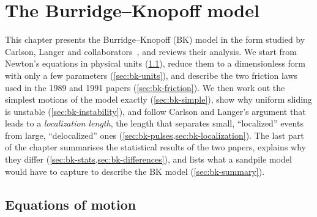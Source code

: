 \chapter{The Burridge--Knopoff model}
\label{ch:bk}

This chapter presents the Burridge--Knopoff (BK) model in the form studied by Carlson,
Langer and collaborators~\cite{CarlsonLanger1989,Carlson1991}, and reviews their analysis.
We start from Newton's equations in physical units (\cref{sec:bk-eom}), reduce them to a
dimensionless form with only a few parameters (\cref{sec:bk-units}), and describe the two
friction laws used in the 1989 and 1991 papers (\cref{sec:bk-friction}). We then work out the
simplest motions of the model exactly (\cref{sec:bk-simple}), show why uniform sliding is
unstable (\cref{sec:bk-instability}), and follow Carlson and Langer's argument that leads to a
\emph{localization length}, the length that separates small, ``localized'' events from large,
``delocalized'' ones (\cref{sec:bk-pulses,sec:bk-localization}). The last part of the chapter
summarises the statistical results of the two papers, explains why they differ
(\cref{sec:bk-stats,sec:bk-differences}), and lists what a sandpile model would have to capture to
describe the BK model (\cref{sec:bk-summary}).

\section{Equations of motion}
\label{sec:bk-eom}

